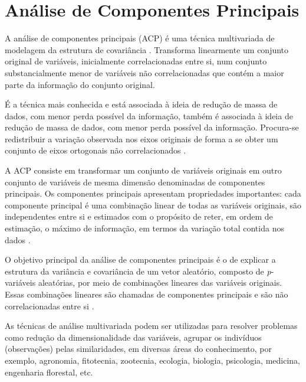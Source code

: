 \section{Análise de Componentes Principais}

A análise de componentes principais (ACP) é uma técnica multivariada de modelagem da estrutura de covariância \cite{sandanielo2015}. 
Transforma linearmente um conjunto
original de variáveis, inicialmente correlacionadas  entre si, num conjunto substancialmente menor de variáveis não correlacionadas que contém a maior parte da informação do conjunto original. 

É a técnica mais conhecida e
está associada à ideia de redução de massa de dados, com menor perda possível da
informação,
também é associada à ideia de redução de
massa de dados, com menor perda possível
da informação. Procura-se redistribuir a
variação observada nos eixos originais de
forma a se obter um conjunto de eixos
ortogonais não correlacionados  .


A ACP consiste em transformar
um conjunto de variáveis originais em outro
conjunto de variáveis de mesma dimensão
denominadas de componentes principais.
Os componentes principais apresentam
propriedades importantes: cada
componente principal é uma combinação linear de todas as variáveis originais, são
independentes entre si e estimados com o
propósito de reter, em ordem de estimação,
o máximo de informação, em termos da
variação total contida nos dados
   .

O objetivo principal da análise de
componentes principais é o de explicar a
estrutura da variância e covariância de um
vetor aleatório, composto de \textit{p}-variáveis
aleatórias, por meio de combinações
lineares das variáveis originais. Essas
combinações lineares são chamadas de
componentes principais e são não
correlacionadas entre si \cite{sandanielo2015}.

As técnicas de análise multivariada podem ser
utilizadas para resolver problemas como redução da dimensionalidade das variáveis, agrupar os
indivíduos (observações) pelas
similaridades, em diversas áreas do
conhecimento, por exemplo, agronomia,
fitotecnia, zootecnia, ecologia, biologia,
psicologia, medicina, engenharia florestal,
etc.

